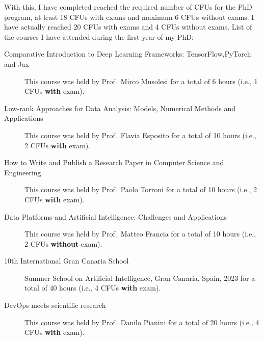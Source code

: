 \documentclass[
]{ceurart}
\begin{document}
With this, I have completed reached the required number of CFUs for the PhD program, at least 18 CFUs with exams and maximum 6 CFUs without exams.
%
I have actually reached 20 CFUs with exams and 4 CFUs without exams.
%
List of the courses I have attended during the first year of my PhD:
%
\begin{description}
    \item[Comparative Introduction to Deep Learning Frameworks: TensorFlow,PyTorch and Jax] This course was held by Prof.~Mirco Musolesi for a total of 6 hours (i.e., 1 CFUs \textbf{with} exam).
    \item[Low-rank Approaches for Data Analysis: Models, Numerical Methods and Applications] This course was held by Prof.~Flavia Esposito for a total of 10 hours (i.e., 2 CFUs \textbf{with} exam).
    \item[How to Write and Publish a Research Paper in Computer Science and Engineering] This course was held by Prof.~Paolo Torroni for a total of 10 hours (i.e., 2 CFUs \textbf{with} exam).
    \item[Data Platforms and Artificial Intelligence: Challenges and Applications] This course was held by Prof.~Matteo Francia for a total of 10 hours (i.e., 2 CFUs \textbf{without} exam).
    \item[10th International Gran Canaria School] Summer School on Artificial Intelligence, Gran Canaria, Spain, 2023 for a total of 40 hours (i.e., 4 CFUs \textbf{with} exam).
    \item[DevOps meets scientific research] This course was held by Prof.~Danilo Pianini for a total of 20 hours (i.e., 4 CFUs \textbf{with} exam).
\end{description}


\end{document}
